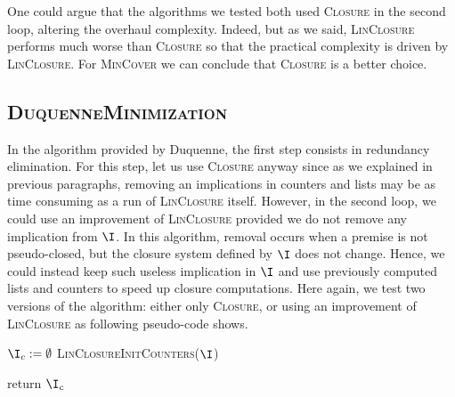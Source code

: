 \vspace{1.2em}

One could argue that the algorithms we tested both used \textsc{Closure} in the second loop, altering the overhaul complexity. Indeed, but as we said, \textsc{LinClosure} performs much worse than \textsc{Closure} so that the practical complexity is driven by \textsc{LinClosure}. For \textsc{MinCover}
we can conclude that \textsc{Closure} is a better choice.

\subsection{\textsc{DuquenneMinimization}}

In the algorithm provided by Duquenne, the first step consists in redundancy elimination. For this step, let us use \textsc{Closure} anyway since as we
explained in previous paragraphs, removing an implications in counters and
lists may be as time consuming as a run of \textsc{LinClosure} itself. However,
in the second loop, we could use an improvement of \textsc{LinClosure} provided
we do not remove any implication from $\I$. In this algorithm, removal occurs
when a premise is not pseudo-closed, but the closure system defined by $\I$
does not change. Hence, we could instead keep such useless implication in 
$\I$ and use previously computed lists and counters to speed up closure computations. Here again, we test two versions of the algorithm: either only
\textsc{Closure}, or using an improvement of \textsc{LinClosure} as following pseudo-code shows.

\vspace{1.2em}

\begin{algorithm}[H]
	
	\BlankLine
	\BlankLine
	
	$\I_c := \emptyset$ \;
	\textsc{LinClosureInitCounters}($\I$) \;
	
	
	return $\I_c$ \;

	\label{alg:DuquenneLin}
	
\end{algorithm}

